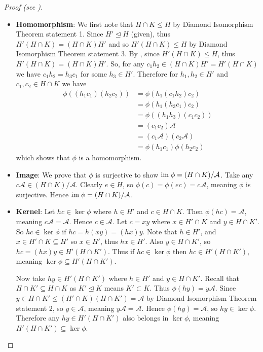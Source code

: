 \begin{proof}[Proof (see {\cite[p.~110]{hungerford_1980}})]
\begin{itemize}
        \item \textbf{Homomorphism}: We first note that $H \cap K \leq H$ by Diamond Isomorphism Theorem statement 1. Since $H' \unlhd H$ (given), thus $H'(H\cap K) = (H\cap K)H'$ and so $H'(H\cap K) \leq H$ by Diamond Isomorphism Theorem statement 3. By , since $H'(H\cap K) \leq H$, thus $H'(H\cap K) = (H\cap K)H'$. So, for any $c_1h_2 \in (H\cap K)H' = H'(H\cap K)$ we have $c_1h_2 = h_3c_1$ for some $h_3 \in H'$. Therefore for $h_1, h_2 \in H'$ and $c_1, c_2 \in H \cap K$ we have
        \begin{align*}
            \phi((h_1c_1)(h_2c_2)) &= \phi(h_1(c_1h_2)c_2)\\
            &= \phi(h_1(h_3c_1)c_2)\\
            &= \phi((h_1h_3)(c_1c_2))\\
            &= (c_1c_2)\mathcal{A}\\
            &= (c_1\mathcal{A})(c_2\mathcal{A})\\
            &= \phi(h_1c_1)\phi(h_2c_2)
        \end{align*}
        which shows that $\phi$ is a homomorphism.
        
        \item \textbf{Image}: We prove that $\phi$ is surjective to show $\mathrm{im}\; \phi = (H\cap K)/\mathcal{A}$. Take any $c\mathcal{A} \in (H\cap K) / \mathcal{A}$. Clearly $e \in H$, so $\phi(c) = \phi(ec) = c\mathcal{A}$, meaning $\phi$ is surjective. Hence $\mathrm{im}\; \phi = (H\cap K)/\mathcal{A}$.
        
        \item \textbf{Kernel}: Let $hc \in \ker\phi$ where $h \in H'$ and $c \in H \cap K$. Then $\phi(hc) = \mathcal{A}$, meaning $c\mathcal{A} = \mathcal{A}$. Hence $c \in \mathcal{A}$. Let $c = xy$ where $x \in H'\cap K$ and $y \in H \cap K'$. So $hc \in \ker\phi$ if $hc = h(xy) = (hx)y$. Note that $h \in H'$, and $x \in H' \cap K \subseteq H'$ so $x \in H'$, thus $hx \in H'$. Also $y \in H \cap K'$, so $hc = (hx)y \in H'(H \cap K')$. Thus if $hc \in \ker\phi$ then $hc \in H'(H \cap K')$, meaning $\ker\phi \subseteq H'(H \cap K')$.
        
        Now take $hy \in H'(H \cap K')$ where $h \in H'$ and $y \in H \cap K'$. Recall that $H\cap K' \subseteq H\cap K$ as $K' \unlhd K$ means $K' \subset K$. Thus $\phi(hy) = y\mathcal{A}$. Since $y \in H \cap K' \leq (H' \cap K)(H \cap K') = \mathcal{A}$ by Diamond Isomorphism Theorem statement 2, so $y \in \mathcal{A}$, meaning $y\mathcal{A} = \mathcal{A}$. Hence $\phi(hy) = \mathcal{A}$, so $hy \in \ker\phi$. Therefore any $hy \in H'(H \cap K')$ also belongs in $\ker\phi$, meaning $H'(H \cap K') \subseteq \ker\phi$.
        

\end{itemize}
\end{proof}
